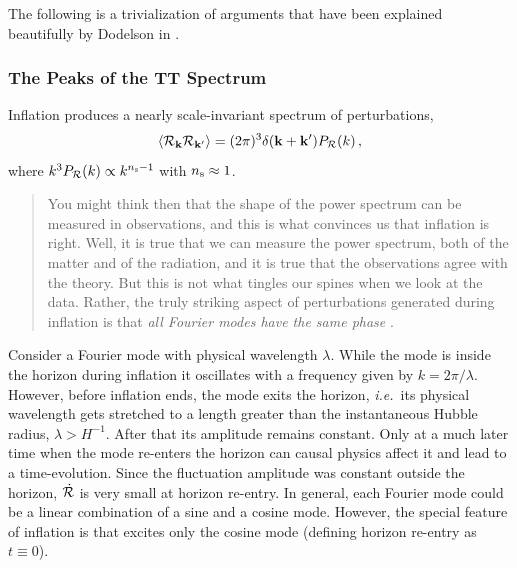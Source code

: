 \documentclass[12pt,letterpaper,rotate]{article}
\def\beq{\begin{equation}}
\def\eeq{\end{equation}}
\def\R{{\cal R}}
\begin{document}
{%
The following is a trivialization of arguments that have been explained beautifully by Dodelson in  \cite{Dodelson:2003ip}.

\subsubsection{The Peaks of the TT Spectrum}

Inflation produces a nearly scale-invariant spectrum of perturbations,
\beq
\langle \R_{\bf k} \R_{\bf k'} \rangle = (2\pi)^3 \delta ({\bf k} +{\bf k}') P_\R(k)\, ,
\eeq
where $k^3 P_\R(k) \propto k^{n_{\rm s}-1}$ with $n_{\rm s} \approx 1$.
\begin{quote}
You might think then that the shape of the power spectrum can be measured in observations, and this is what convinces us that inflation is right. Well, it is true that we can measure the power spectrum, both of the matter and of the radiation, and it is true that the observations agree with the theory. But this is not what tingles our spines when we look at the data. Rather, the truly striking aspect of perturbations generated during inflation is that {\it all Fourier modes have the same phase}  \cite{Dodelson:2003ip}.
\end{quote}
Consider a Fourier mode with physical wavelength $\lambda$. While the mode is inside the horizon during inflation it oscillates with a frequency given by $k = 2\pi/\lambda$. However, before inflation ends, the mode exits the horizon, {\it i.e.}~its physical wavelength gets stretched to a length greater than the instantaneous Hubble radius, $\lambda > H^{-1}$. After that its amplitude remains constant. Only at a much later time when the mode re-enters the horizon can causal physics affect it and lead to a time-evolution. 
Since the fluctuation amplitude was constant outside the horizon, $\dot \R$ is very small at horizon re-entry. 
In general, each Fourier mode could be a linear combination of a sine and a cosine mode. However, the special feature of inflation is that excites only the cosine mode (defining horizon re-entry as $t \equiv 0$).

}
\end{document}
